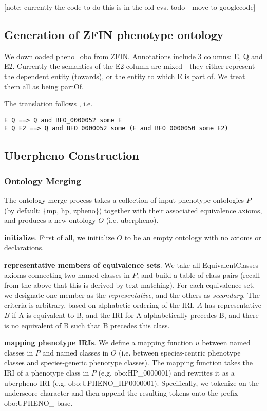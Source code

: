 [note: currently the code to do this is in the old cvs. todo - move to googlecode]

\subsection{Generation of ZFIN phenotype ontology}

We downloaded pheno_obo from ZFIN. Annotations include 3 columns: E, Q
and E2. Currently the semantics of the E2 column are mixed - they
either represent the dependent entity (towards), or the entity to
which E is part of. We treat them all as being partOf.

The translation follows \cite{MungallPheno2009}, i.e.

\begin{verbatim}
E Q ==> Q and BFO_0000052 some E
E Q E2 ==> Q and BFO_0000052 some (E and BFO_0000050 some E2)
\end{verbatim}

\subsection{Uberpheno Construction}

\subsubsection{Ontology Merging}

The ontology merge process takes a collection of input phenotype
ontologies $P$ (by default: \{mp, hp, zpheno\}) together with their
associated equivalence axioms, and produces a new ontology $O$
(i.e. uberpheno).

\textbf{initialize}. First of all, we initialize $O$ to be an empty
ontology with no axioms or declarations.

\textbf{representative members of equivalence sets}. We take all
EquivalentClasses axioms connecting two named classes in $P$, and
build a table of class pairs (recall from the above that this is
derived by text matching). For each equivalence set, we designate one
member as the \emph{representative}, and the others as
\emph{secondary}. The criteria is arbitrary, based on alphabetic
ordering of the IRI. $A$ has representative $B$ if A is equivalent
to B, and the IRI for A alphabetically precedes B, and there is no
equivalent of B such that B precedes this class.

\textbf{mapping phenotype IRIs}. We define a mapping function $u$
between named classes in $P$ and named classes in $O$
(i.e. between species-centric phenotype classes and species-generic
phenotype classes). The mapping function takes the IRI of a phenotype
class in $P$ (e.g. obo:HP_0000001) and rewrites it as a uberpheno
IRI (e.g. obo:UPHENO_HP0000001). Specifically, we tokenize on the
underscore character and then append the resulting tokens onto the
prefix obo:UPHENO_ base.


